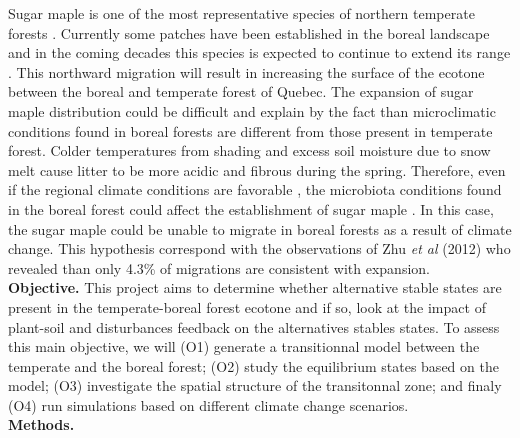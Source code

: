 Sugar maple is one of the most representative species of northern temperate forests \cite{Graignic2013,Messaoud2007,Kellman2004}. Currently some patches have been established in the boreal landscape  and in the coming decades this species is expected to continue to extend its range \cite{Graignic2013,Goldblum2005,Woodall2009}. This northward migration will result in increasing the surface of the ecotone between the boreal and temperate forest of Quebec. The expansion of sugar maple distribution could be difficult and explain by the fact than microclimatic conditions found in boreal forests are different from those present in temperate forest. Colder temperatures from shading and excess soil moisture due to snow melt cause litter to be more acidic and fibrous during the spring. Therefore, even if the regional climate conditions are favorable \cite{Kellman2004}, the microbiota conditions found in the boreal forest could affect the establishment of sugar maple \cite{Kellman2004,Moore2008,DeFrenne2013}. In this case, the sugar maple could be unable to migrate in boreal forests as a result of climate change. This hypothesis correspond with the observations of Zhu \emph{et al} (2012) who revealed than only 4.3\% of migrations are consistent with expansion\cite{Zhu2012}.\\


\textbf{Objective.} This project aims to determine whether alternative stable states are present in the temperate-boreal forest ecotone and if so, look at the impact of plant-soil and disturbances feedback on the alternatives stables states. To assess this main objective, we will (O1) generate a transitionnal model between the temperate and the boreal forest; (O2) study the equilibrium states based on the model; (O3) investigate the spatial structure of the transitonnal zone; and finaly (O4) run simulations based on different climate change scenarios. \\

\textbf{Methods.}




\newpage



\newpage


